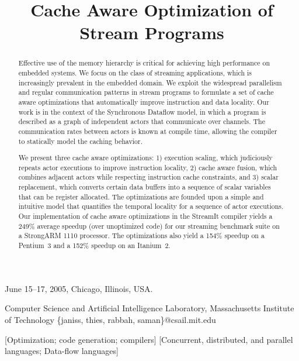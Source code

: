 \documentclass{sigplanconf}
\begin{document}
 {June 15--17, 2005, Chicago, Illinois, USA.}

\title{Cache Aware Optimization of Stream Programs}
	     {Computer Science and Artificial Intelligence Laboratory, Massachusetts Institute of Technology}
	     {\{janiss, thies, rabbah, saman\}@csail.mit.edu}

\maketitle

\begin{abstract}
Effective use of the memory hierarchy is critical for achieving high
performance on embedded systems.  We focus on the class of streaming
applications, which is increasingly prevalent in the embedded domain.  We
exploit the widespread parallelism and regular communication patterns
in stream programs to formulate a set of cache aware optimizations
that automatically improve instruction and data locality.  Our work is
in the context of the Synchronous Dataflow model, in which a program
is described as a graph of independent actors that communicate over
channels.  The communication rates between actors is known at compile
time, allowing the compiler to statically model the caching behavior.

We present three cache aware optimizations: 1) execution scaling,
which judiciously repeats actor executions to improve instruction
locality, 2) cache aware fusion, which combines adjacent actors while
respecting instruction cache constraints, and 3) scalar replacement,
which converts certain data buffers into a sequence of scalar
variables that can be register allocated.  The optimizations are
founded upon a simple and intuitive model that quantifies the temporal
locality for a sequence of actor executions.  Our implementation of
cache aware optimizations in the StreamIt compiler yields a 249\%
average speedup (over unoptimized code) for our streaming benchmark
suite on a StrongARM 1110 processor.  The optimizations also yield a
154\% speedup on a Pentium~3 and a 152\% speedup on an Itanium~2.

\end{abstract}

[Optimization; code generation; compilers]
[Concurrent, distributed, and parallel languages; Data-flow languages]
\end{document}
